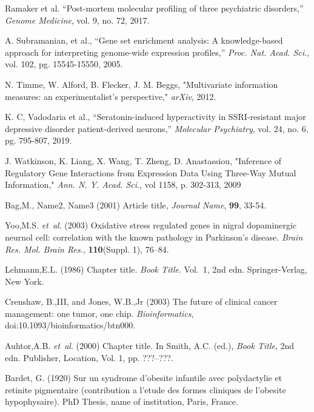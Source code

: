 \documentclass{bioinfo}
\begin{document}
\begin{thebibliography}{}
Ramaker et al. “Post-mortem molecular profiling of three psychiatric disorders,” {\it Genome Medicine}, vol. 9, no. 72, 2017.

A. Subramanian, et al., “Gene set enrichment analysis: A knowledge-based approach for interpreting genome-wide expression profiles,” {\it Proc. Nat. Acad. Sci.}, vol. 102, pg. 15545-15550, 2005.

N. Timme, W. Alford, B. Flecker, J. M. Beggs, "Multivariate information measures: an experimentalist's perspective," {\it arXiv}, 2012.

K. C, Vadodaria et al., “Seratonin-induced hyperactivity in SSRI-resistant major depressive disorder patient-derived neurons,” {\it Molecular Psychiatry}, vol. 24, no. 6,  pg. 795-807, 2019.

J. Watkinson, K. Liang, X. Wang, T. Zheng, D. Anastassiou, "Inference of Regulatory Gene Interactions from Expression Data Using Three-Way Mutual Information," {\it Ann. N. Y. Acad. Sci.}, vol 1158, p. 302-313, 2009

Bag,M., Name2, Name3 (2001) Article title, {\it Journal Name}, {\bf 99}, 33-54.

Yoo,M.S. \textit{et~al}. (2003) Oxidative stress regulated genes
in nigral dopaminergic neurnol cell: correlation with the known
pathology in Parkinson's disease. \textit{Brain Res. Mol. Brain
Res.}, \textbf{110}(Suppl. 1), 76--84.

Lehmann,E.L. (1986) Chapter title. \textit{Book Title}. Vol.~1, 2nd edn. Springer-Verlag, New York.

Crenshaw, B.,III, and Jones, W.B.,Jr (2003) The future of clinical
cancer management: one tumor, one chip. \textit{Bioinformatics},
doi:10.1093/bioinformatics/btn000.

Auhtor,A.B. \textit{et~al}. (2000) Chapter title. In Smith, A.C.
(ed.), \textit{Book Title}, 2nd edn. Publisher, Location, Vol. 1, pp.
???--???.

Bardet, G. (1920) Sur un syndrome d'obesite infantile avec
polydactylie et retinite pigmentaire (contribution a l'etude des
formes cliniques de l'obesite hypophysaire). PhD Thesis, name of
institution, Paris, France.

\end{thebibliography}
\end{document}
